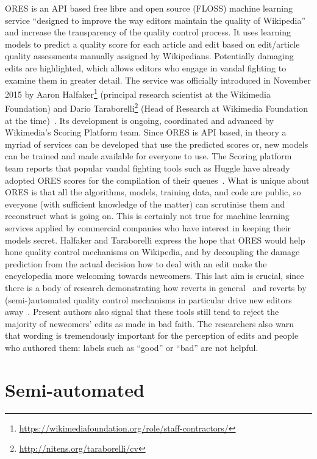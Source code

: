 ORES is an API based free libre and open source (FLOSS) machine learning service ``designed to improve the way editors maintain the quality of Wikipedia'' \cite{HalTar2015} and increase the transparency of the quality control process.
It uses learning models to predict a quality score for each article and edit based on edit/article quality assessments manually assigned by Wikipedians.
Potentially damaging edits are highlighted, which allows editors who engage in vandal fighting to examine them in greater detail.
The service was officially introduced in November 2015 by Aaron Halfaker\footnote{\url{https://wikimediafoundation.org/role/staff-contractors/}} (principal research scientist at the Wikimedia Foundation) and Dario Taraborelli\footnote{\url{http://nitens.org/taraborelli/cv}} (Head of Research at Wikimedia Foundation at the time)~\cite{HalTar2015}.
Its development is ongoing, coordinated and advanced by Wikimedia's Scoring Platform team.
Since ORES is API based, in theory a myriad of services can be developed that use the predicted scores or, new models can be trained and made available for everyone to use.
The Scoring platform team reports that popular vandal fighting tools such as Huggle have already adopted ORES scores for the compilation of their queues~\cite{HalTar2015}.
What is unique about ORES is that all the algorithms, models, training data, and code are public, so everyone (with sufficient knowledge of the matter) can scrutinise them and reconstruct what is going on.
This is certainly not true for machine learning services applied by commercial companies who have interest in keeping their models secret.
Halfaker and Taraborelli express the hope that ORES would help hone quality control mechanisms on Wikipedia, and by decoupling the damage prediction from the actual decision how to deal with an edit make the encyclopedia more welcoming towards newcomers.
This last aim is crucial, since there is a body of research demonstrating how reverts in general~\cite{HalKitRied2011} and reverts by (semi-)automated quality control mechanisms in particular drive new editors away~\cite{HalGeiMorRied2013}.
Present authors also signal that these tools still tend to reject the majority of newcomers' edits as made in bad faith.
The researchers also warn that wording is tremendously important for the perception of edits and people who authored them: labels such as ``good'' or ``bad'' are not helpful.

\section{Semi-automated}

